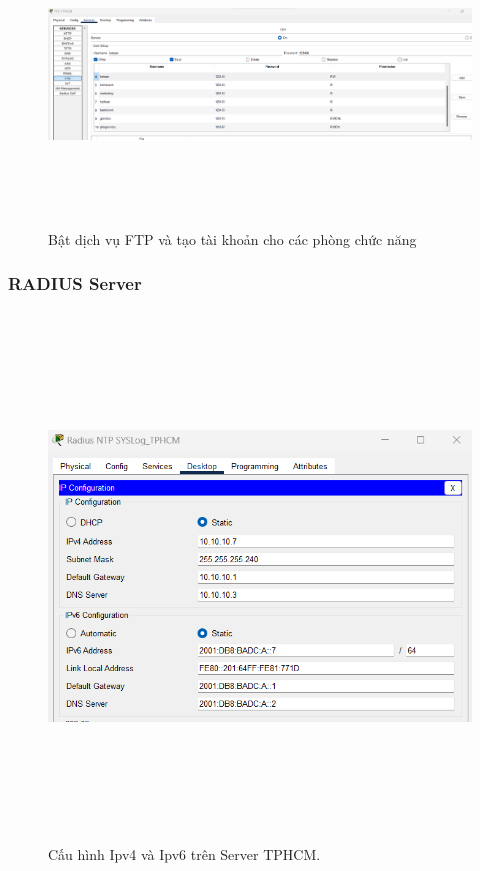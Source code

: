 \documentclass[12pt,a4paper]{report}
\begin{document}
\begin{figure}[H]
    \centering
    \includegraphics[width=16cm, height=8cm]{img/FTP_Server2.png}
    \caption{ Bật dịch vụ FTP và tạo tài khoản cho các phòng chức năng}
    \label{hinh423b}
\end{figure}
\subsubsection{RADIUS Server}
\begin{figure}[H]
    \centering
    \includegraphics[width=16cm, height=14cm]{img/Radius1.png}
    \caption{Cấu hình Ipv4 và Ipv6 trên Server TPHCM.}
    \label{hinh425a}
\end{figure}
\end{document}
